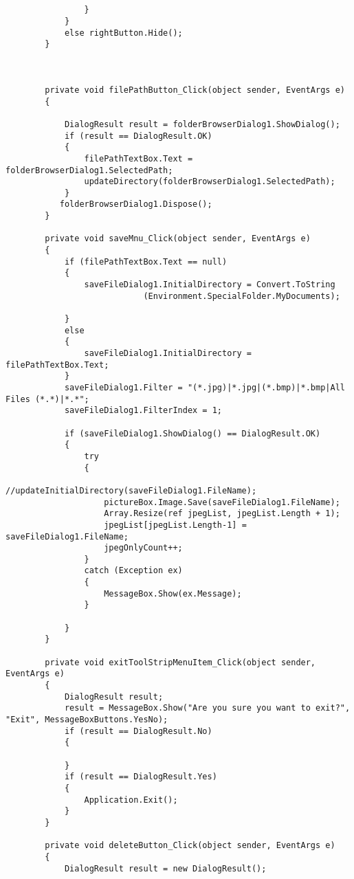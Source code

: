 \begin{lstlisting}[caption=Main Form of GUI, label=appen:main_form]
  
  
                }
            }
            else rightButton.Hide();
        }
            
        

        private void filePathButton_Click(object sender, EventArgs e)
        {
            
            DialogResult result = folderBrowserDialog1.ShowDialog();
            if (result == DialogResult.OK)
            {
                filePathTextBox.Text = folderBrowserDialog1.SelectedPath;
                updateDirectory(folderBrowserDialog1.SelectedPath);
            }
           folderBrowserDialog1.Dispose();
        }

        private void saveMnu_Click(object sender, EventArgs e)
        {
            if (filePathTextBox.Text == null)
            {
                saveFileDialog1.InitialDirectory = Convert.ToString
                			(Environment.SpecialFolder.MyDocuments);
                
            }
            else
            {
                saveFileDialog1.InitialDirectory = filePathTextBox.Text;
            }
            saveFileDialog1.Filter = "(*.jpg)|*.jpg|(*.bmp)|*.bmp|All Files (*.*)|*.*";
            saveFileDialog1.FilterIndex = 1;

            if (saveFileDialog1.ShowDialog() == DialogResult.OK)
            {
                try
                {
                    //updateInitialDirectory(saveFileDialog1.FileName);
                    pictureBox.Image.Save(saveFileDialog1.FileName);
                    Array.Resize(ref jpegList, jpegList.Length + 1);
                    jpegList[jpegList.Length-1] = saveFileDialog1.FileName;
                    jpegOnlyCount++;
                }
                catch (Exception ex)
                {
                    MessageBox.Show(ex.Message);
                }

            }
        }

        private void exitToolStripMenuItem_Click(object sender, EventArgs e)
        {
            DialogResult result;
            result = MessageBox.Show("Are you sure you want to exit?", "Exit", MessageBoxButtons.YesNo);
            if (result == DialogResult.No)
            {

            }
            if (result == DialogResult.Yes)
            {
                Application.Exit();
            }
        }

        private void deleteButton_Click(object sender, EventArgs e)
        {
            DialogResult result = new DialogResult();


\end{lstlisting}
